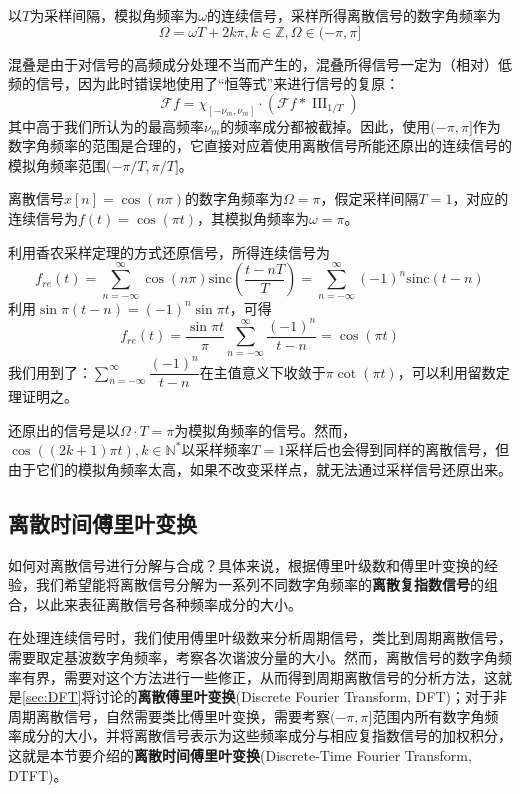 \documentclass{ctexbook}
\newcommand{\shah}{\operatorname{III}}
\begin{document}
\begin{proposition}
以$T$为采样间隔，模拟角频率为$\omega$的连续信号，采样所得离散信号的数字角频率为
\[\Omega=\omega T+2k\pi,k\in\mathbb{Z},\Omega\in(-\pi,\pi]\]
\end{proposition}

混叠是由于对信号的高频成分处理不当而产生的，混叠所得信号一定为（相对）低频的信号，因为此时错误地使用了“恒等式”来进行信号的复原：
\[\mathcal{F} f=\chi_{[-\nu_m,\nu_m]}\cdot (\mathcal{F} f*\shah_{1/T})\]
其中高于我们所认为的最高频率$\nu_m$的频率成分都被截掉。因此，使用$(-\pi,\pi]$作为数字角频率的范围是合理的，它直接对应着使用离散信号所能还原出的连续信号的模拟角频率范围$(-\pi/T,\pi/T]$。

\begin{example}
    离散信号$x[n]=\cos(n\pi)$的数字角频率为$\Omega=\pi$，假定采样间隔$T=1$，对应的连续信号为$f(t)=\cos(\pi t)$，其模拟角频率为$\omega=\pi$。

    利用香农采样定理的方式还原信号，所得连续信号为
    \[f_{re}(t)=\sum_{n=-\infty}^{\infty}\cos(n\pi)\text{sinc}\left(\frac{t-nT}{T}\right)=\sum_{n=-\infty}^{\infty}(-1)^n\text{sinc}\left(t-n\right)\]
    利用$\sin\pi(t-n)=(-1)^n\sin\pi t$，可得
    \[f_{re}(t)=\frac{\sin\pi t}{\pi}\sum_{n=-\infty}^{\infty}\frac{(-1)^n}{t-n}=\cos(\pi t)\]
    我们用到了：$\sum_{n=-\infty}^{\infty}\dfrac{(-1)^n}{t-n}$在主值意义下收敛于$\pi\cot(\pi t)$，可以利用留数定理证明之。

    还原出的信号是以$\Omega\cdot T=\pi$为模拟角频率的信号。然而，$\cos((2k+1)\pi t),k\in\mathbb{N}^*$以采样频率$T=1$采样后也会得到同样的离散信号，但由于它们的模拟角频率太高，如果不改变采样点，就无法通过采样信号还原出来。
\end{example}

\subsection{离散时间傅里叶变换}\label{sub:dtft}

如何对离散信号进行分解与合成？具体来说，根据傅里叶级数和傅里叶变换的经验，我们希望能将离散信号分解为一系列不同数字角频率的\textbf{离散复指数信号}的组合，以此来表征离散信号各种频率成分的大小。

在处理连续信号时，我们使用傅里叶级数来分析周期信号，类比到周期离散信号，需要取定基波数字角频率，考察各次谐波分量的大小。然而，离散信号的数字角频率有界，需要对这个方法进行一些修正，从而得到周期离散信号的分析方法，这就是\ref{sec:DFT}将讨论的\textbf{离散傅里叶变换}(Discrete Fourier Transform, DFT)；对于非周期离散信号，自然需要类比傅里叶变换，需要考察$(-\pi,\pi]$范围内所有数字角频率成分的大小，并将离散信号表示为这些频率成分与相应复指数信号的加权积分，这就是本节要介绍的\textbf{离散时间傅里叶变换}(Discrete-Time Fourier Transform, DTFT)。
\end{document}
